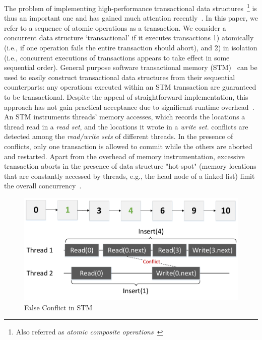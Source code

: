 \documentclass[10pt,conference,compsocconf]{IEEEtran}
\begin{document}
The problem of implementing high-performance transactional data structures~\footnote{Also referred as \emph{atomic composite operations}~\cite{golan2013concurrent}} is thus an important one and has gained much attention recently~\cite{golan2013concurrent,bronson2010transactional,herlihy2008transactional,gramoli2013composing,golan2015automatic,hassan2014integrating,koskinen2010coarse}. 
In this paper, we refer to a sequence of atomic operations as a transaction.
We consider a concurrent data structure `transactional' if it executes transactions 1) atomically (i.e., if one operation fails the entire transaction should abort), and 2) in isolation (i.e., concurrent executions of transactions appears to take effect in some sequential order).
General purpose software transactional memory (STM)~\cite{shavit1997software,herlihy2003software} can be used to easily construct transactional data structures from their sequential counterparts: any operations executed within an STM transaction are guaranteed to be transactional.
Despite the appeal of straightforward implementation, this approach has not gain practical acceptance due to significant runtime overhead~\cite{cascaval2008software}.
An STM instruments threads' memory accesses, which records the locations a thread read in a \emph{read set}, and the locations it wrote in a \emph{write set}. 
conflicts are detected among the \emph{read/write sets} of different threads. 
In the presence of conflicts, only one transaction is allowed to commit while the others are aborted and restarted.
Apart from the overhead of memory instrumentation, excessive transaction aborts in the presence of data structure "hot-spot" (memory locations that are constantly accessed by threads, e.g., the head node of a linked list) limit the overall concurrency~\cite{herlihy2008transactional}.
\begin{figure}[h]
    \centering
    \includegraphics[width=0.8\columnwidth]{figure/stmconflict.pdf}
    \caption{False Conflict in STM}
    \label{fig:stmconflict}
\end{figure}
\end{document}
